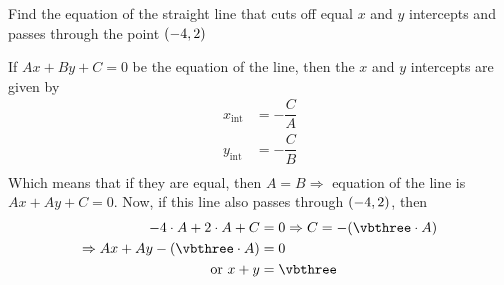 



\gcalcexpr[0]{\vbthree}{\vbone + \vbtwo}

\question[4] Find the equation of the straight line that cuts off equal $x$ and $y$ intercepts 
and passes through the point $(-4, 2)$


\watchout

\ifprintanswers
\fi 

\begin{solution}[\halfpage]
   If $Ax + By + C = 0$ be the equation of the line, then the $x$ and $y$ intercepts are given by
   \begin{align}
   	  x_{\text{int}} &= -\dfrac{C}{A} \\ 
   	  y_{\text{int}} &= -\dfrac{C}{B} \\
   \end{align}
   Which means that if they are equal, then $A = B \Rightarrow$ equation of the line is $Ax + Ay + C = 0$. 
   Now, if this line also passes through $(-4, 2)$, then 
   \begin{align}
      \vbone\cdot A + \vbtwo\cdot A + C &= 0 \Rightarrow C = -(\vbthree\cdot A) \\
      \Rightarrow Ax + Ay - (\vbthree\cdot A) &= 0 \\
      \text{ or } x + y &= \vbthree
   \end{align}
   
\end{solution}


